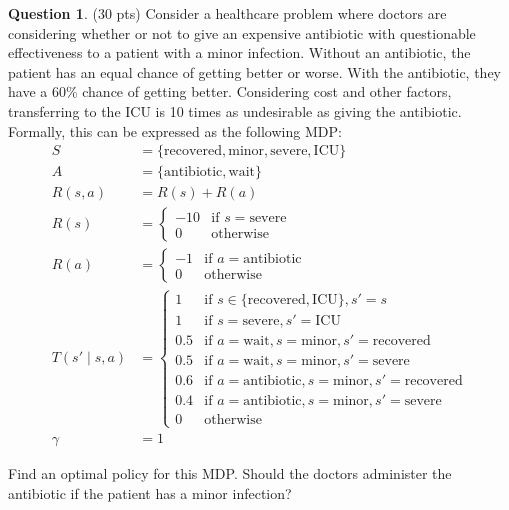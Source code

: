 \documentclass{article}
\theoremstyle{definition}
\newtheorem{question}[thm]{Question}
\begin{document}
\begin{samepage}
\begin{question} (30 pts)
    Consider a healthcare problem where doctors are considering whether or not to give an expensive antibiotic with questionable effectiveness to a patient with a minor infection. Without an antibiotic, the patient has an equal chance of getting better or worse. With the antibiotic, they have a 60\% chance of getting better. Considering cost and other factors, transferring to the ICU is 10 times as undesirable as giving the antibiotic. Formally, this can be expressed as the following MDP:
    \begin{align*}
        S &= \{\text{recovered}, \text{minor}, \text{severe}, \text{ICU}\} \\
        A &= \{\text{antibiotic}, \text{wait}\} \\
        R(s, a) &= R(s) + R(a) \\
        R(s) &= \begin{cases}
            -10 &\text{if } s = \text{severe} \\
            0 &\text{otherwise}
        \end{cases} \\
        R(a) &= \begin{cases}
            -1 &\text{if } a = \text{antibiotic} \\
            0  &\text{otherwise}
        \end{cases} \\
        T(s' \mid s, a) &= \begin{cases}
            1 &\text{if } s \in \{\text{recovered}, \text{ICU}\}, s' = s\\ 
            1 &\text{if } s = \text{severe}, s' = \text{ICU} \\
            0.5 &\text{if } a = \text{wait}, s = \text{minor}, s' = \text{recovered} \\
            0.5 &\text{if } a = \text{wait}, s = \text{minor}, s' = \text{severe} \\
            0.6 &\text{if } a = \text{antibiotic}, s = \text{minor}, s' = \text{recovered} \\
            0.4 &\text{if } a = \text{antibiotic}, s = \text{minor}, s' = \text{severe} \\
            0 &\text{otherwise}
        \end{cases} \\
        \gamma &= 1
    \end{align*}

    Find an optimal policy for this MDP. Should the doctors administer the antibiotic if the patient has a minor infection?
\end{question}   
\end{samepage}
\end{document}

